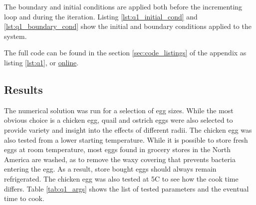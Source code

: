 \documentclass[12pt]{article}
\begin{document}
\noindent The boundary and initial conditions are applied both before the incrementing loop and during the iteration. Listing \ref{lst:q1_initial_cond} and \ref{lst:q1_boundary_cond} show the initial and boundary conditions applied to the system.





\noindent The full code can be found in the section \ref{sec:code_listings} of the appendix as listing \ref{lst:q1}, or \href{https://github.com/Awbmilne/ME303-Numerical-PDE-Solution}{online}.

\subsection{Results}

The numerical solution was run for a selection of egg sizes. While the most obvious choice is a chicken egg, quail and ostrich eggs were also selected to provide variety and insight into the effects of different radii. The chicken egg was also tested from a lower starting temperature. While it is possible to store fresh eggs at room temperature, most eggs found in grocery stores in the North America are washed, as to remove the waxy covering that prevents bacteria entering the egg. As a result, store bought eggs should always remain refrigerated. The chicken egg was also tested at 5\textdegree C to see how the cook time differs. Table \ref{tab:q1_args} shows the list of tested parameters and the eventual time to cook.
\end{document}
